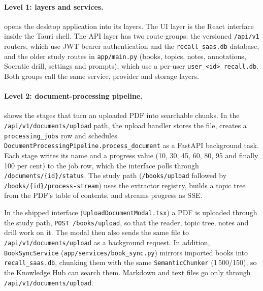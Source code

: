 
\paragraph{Level 1: layers and services.}
 opens the desktop application into its layers. The UI layer is the
React interface inside the Tauri shell. The API layer has two route groups: the
versioned \texttt{/api/v1} routers, which use JWT bearer authentication and the
\texttt{recall\_saas.db} database, and the older study routes in
\texttt{app/main.py} (books, topics, notes, annotations, Socratic drill, settings and
prompts), which use a per-user \texttt{user\_<id>\_recall.db}. Both groups call the
same service, provider and storage layers.


\paragraph{Level 2: document-processing pipeline.}
 shows the stages that turn an uploaded PDF into searchable
chunks. In the \texttt{/api/v1/documents/upload} path, the upload handler stores the
file, creates a \texttt{processing\_jobs} row and schedules
\texttt{DocumentProcessingPipeline.process\_document} as a FastAPI background task. Each
stage writes its name and a progress value (10, 30, 45, 60, 80, 95 and finally 100
per cent) to the job row, which the interface polls through
\texttt{/documents/\{id\}/status}. The study path (\texttt{/books/upload} followed by
\texttt{/books/\{id\}/process-stream}) uses the extractor registry, builds a topic tree
from the PDF's table of contents, and streams progress as SSE.

In the shipped interface (\texttt{UploadDocumentModal.tsx}) a PDF is uploaded through
the study path, \texttt{POST /books/upload}, so that the reader, topic tree, notes and
drill work on it. The modal then also sends the same file to
\texttt{/api/v1/documents/upload} as a background request. In
addition, \texttt{BookSyncService} (\texttt{app/services/book\_sync.py}) mirrors
imported books into \texttt{recall\_saas.db}, chunking them with the same
\texttt{SemanticChunker} (1\,500/150), so the Knowledge Hub can search them. Markdown
and text files go only through \texttt{/api/v1/documents/upload}.

